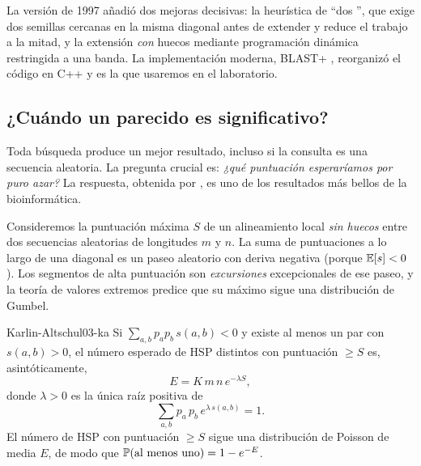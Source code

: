 La versión de 1997 \parencite{c03-altschul1997} añadió dos mejoras decisivas: la heurística de ``dos '', que exige dos semillas cercanas en la misma diagonal antes de extender y reduce el trabajo a la mitad, y la extensión \emph{con} huecos mediante programación dinámica restringida a una banda. La implementación moderna, BLAST+ \parencite{c03-camacho2009}, reorganizó el código en C++ y es la que usaremos en el laboratorio.

\subsection{¿Cuándo un parecido es significativo?}

Toda búsqueda produce un mejor resultado, incluso si la consulta es una secuencia aleatoria. La pregunta crucial es: \emph{¿qué puntuación esperaríamos por puro azar?} La respuesta, obtenida por \textcite{c03-karlin1990}, es uno de los resultados más bellos de la bioinformática.

Consideremos la puntuación máxima $S$ de un alineamiento local \emph{sin huecos} entre dos secuencias aleatorias de longitudes $m$ y $n$. La suma de puntuaciones a lo largo de una diagonal es un paseo aleatorio con deriva negativa (porque $\mathbb{E}[s]<0$). Los segmentos de alta puntuación son \emph{excursiones} excepcionales de ese paseo, y la teoría de valores extremos predice que su máximo sigue una distribución de Gumbel.

\begin{teorema}{Karlin-Altschul}{03-ka}
Si $\sum_{a,b}p_a p_b\,s(a,b) < 0$ y existe al menos un par con $s(a,b)>0$, el número esperado de HSP distintos con puntuación $\ge S$ es, asintóticamente,
\begin{equation}\label{eq:03-evalue}
E = K\,m\,n\,e^{-\lambda S},
\end{equation}
donde $\lambda>0$ es la única raíz positiva de
\begin{equation}\label{eq:03-lambda}
\sum_{a,b} p_a\,p_b\,e^{\lambda\,s(a,b)} = 1.
\end{equation}
El número de HSP con puntuación $\ge S$ sigue una distribución de Poisson de media $E$, de modo que $\mathbb{P}(\text{al menos uno}) = 1-e^{-E}$.
\end{teorema}

\begin{simbolos}
\end{simbolos}

